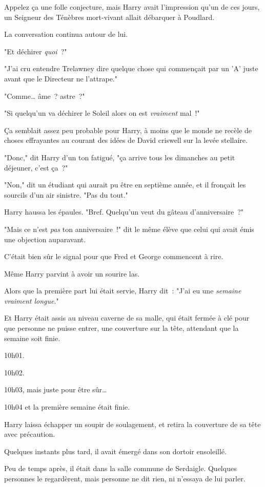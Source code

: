 Appelez ça une folle conjecture, mais Harry avait l'impression qu'un de ces jours, un Seigneur des Ténèbres mort-vivant allait débarquer à Poudlard.

La conversation continua autour de lui.

"Et déchirer \emph{quoi}~?"

"J'ai cru entendre Trelawney dire quelque chose qui commençait par un 'A' juste avant que le Directeur ne l'attrape."

"Comme… âme~? astre~?"

"Si quelqu'un va déchirer le Soleil alors on est \emph{vraiment} mal~!"

Ça semblait assez peu probable pour Harry, à moins que le monde ne recèle de choses effrayantes au courant des idées de David criswell sur la levée stellaire.

"Donc," dit Harry d'un ton fatigué, "ça arrive tous les dimanches au petit déjeuner, c'est ça~?"

"Non," dit un étudiant qui aurait pu être en septième année, et il fronçait les sourcils d'un air sinistre. "Pas du tout."

Harry haussa les épaules. "Bref. Quelqu'un veut du gâteau d'anniversaire~?"

"Mais ce n'est \emph{pas} ton anniversaire~!" dit le même élève que celui qui avait émis une objection auparavant.

C'était bien sûr le signal pour que Fred et George commencent à rire.

Même Harry parvint à avoir un sourire las.

Alors que la première part lui était servie, Harry dit~: "J'ai eu une \emph{semaine vraiment longue}."

\later

Et Harry était assis au niveau caverne de sa malle, qui était fermée à clé pour que personne ne puisse entrer, une couverture sur la tête, attendant que la semaine soit finie.

10h01.

10h02.

10h03, mais juste pour être sûr…

10h04 et la première semaine était finie.

Harry laissa échapper un soupir de soulagement, et retira la couverture de sa tête avec précaution.

Quelques instants plus tard, il avait émergé dans son dortoir ensoleillé.

Peu de temps après, il était dans la salle commune de Serdaigle. Quelques personnes le regardèrent, mais personne ne dit rien, ni n'essaya de lui parler.

